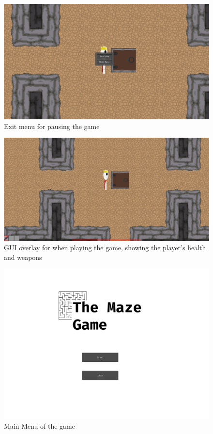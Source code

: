 \documentclass[../Main.tex]{subfiles}
\begin{document}
            \begin{figure}[hbt!]
                \centerline{\includegraphics[scale=0.4]{img/Testing/Objective/ExitMenu.png}}
                \caption{Exit menu for pausing the game}
                \label{fig:ExitMenu}
            \end{figure}
            \begin{figure}[hbt!]
                \centerline{\includegraphics[scale=0.4]{img/Testing/Objective/GUI.png}}
                \caption{GUI overlay for when playing the game, showing the player's health and weapons}
                \label{fig:GUI}
            \end{figure}
            \begin{figure}[hbt!]
                \centerline{\includegraphics[scale=0.6]{img/Testing/Objective/MainMenu.png}}
                \caption{Main Menu of the game}
                \label{fig:MainMenu}
            \end{figure}
\end{document}
